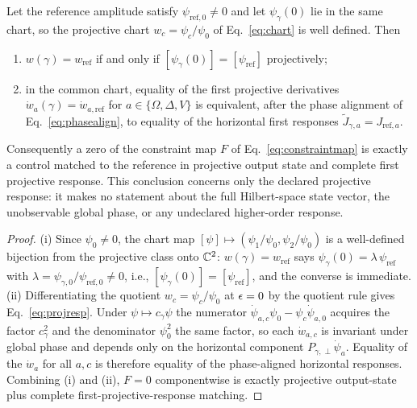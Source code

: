\begin{lemma}\label{lem:chart}
Let the reference amplitude satisfy $\psi_{\mathrm{ref},0}\neq0$ and let
$\psi_{\gamma}(0)$ lie in the same chart, so the projective chart
$w_{c}=\psi_{c}/\psi_{0}$ of Eq.~\eqref{eq:chart} is well defined. Then
\begin{enumerate}[label=(\roman*),itemsep=0.05em]
\item $w(\gamma)=w_{\mathrm{ref}}$ if and only if
$[\psi_{\gamma}(0)]=[\psi_{\mathrm{ref}}]$ projectively;
\item in the common chart, equality of the first projective derivatives
$\dot{w}_{a}(\gamma)=\dot{w}_{a,\mathrm{ref}}$ for
$a\in\{\Omega,\Delta,V\}$ is equivalent, after the phase alignment of
Eq.~\eqref{eq:phasealign}, to equality of the horizontal first responses
$\widetilde{J}_{\gamma,a}=J_{\mathrm{ref},a}$.
\end{enumerate}
Consequently a zero of the constraint map $F$ of Eq.~\eqref{eq:constraintmap} is exactly a
control matched to the reference in projective output state and complete first projective
response. This conclusion concerns only the declared projective response: it makes no
statement about the full Hilbert-space state vector, the unobservable global phase, or any
undeclared higher-order response.
\end{lemma}

\begin{proof}
(i) Since $\psi_{0}\neq0$, the chart map
$[\psi]\mapsto(\psi_{1}/\psi_{0},\psi_{2}/\psi_{0})$ is a well-defined bijection from the
projective class onto $\mathbb{C}^{2}$: $w(\gamma)=w_{\mathrm{ref}}$ says
$\psi_{\gamma}(0)=\lambda\,\psi_{\mathrm{ref}}$ with
$\lambda=\psi_{\gamma,0}/\psi_{\mathrm{ref},0}\neq0$, i.e.,
$[\psi_{\gamma}(0)]=[\psi_{\mathrm{ref}}]$, and the converse is immediate.
(ii) Differentiating the quotient $w_{c}=\psi_{c}/\psi_{0}$ at $\epsilon=0$ by the quotient
rule gives Eq.~\eqref{eq:projresp}. Under $\psi\mapsto c_{\gamma}\psi$ the numerator
$\dot{\psi}_{a,c}\psi_{0}-\psi_{c}\dot{\psi}_{a,0}$ acquires the factor $c_{\gamma}^{2}$
and the denominator $\psi_{0}^{2}$ the same factor, so each $\dot{w}_{a,c}$ is invariant
under global phase and depends only on the horizontal component
$P_{\gamma,\perp}\dot{\psi}_{a}$. Equality of the $\dot{w}_{a}$ for all $a,c$ is therefore
equality of the phase-aligned horizontal responses. Combining (i) and (ii), $F=0$
componentwise is exactly projective output-state plus complete first-projective-response
matching.
\end{proof}

